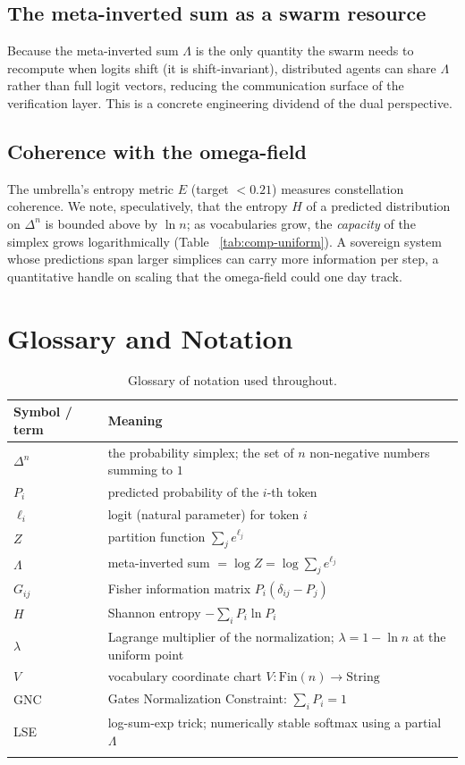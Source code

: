 \documentclass[11pt]{article}
\newcommand{\simplex}[1]{\Delta^{#1}}
\begin{document}
\subsection{The meta-inverted sum as a swarm resource}
\label{sec:sov-swarm}

Because the meta-inverted sum $\Lambda$ is the only quantity the swarm needs to
recompute when logits shift (it is shift-invariant), distributed agents can
share $\Lambda$ rather than full logit vectors, reducing the communication
surface of the verification layer. This is a concrete engineering dividend of
the dual perspective.

\subsection{Coherence with the omega-field}
\label{sec:sov-omega}

The umbrella's entropy metric $E$ (target $<0.21$) measures constellation
coherence. We note, speculatively, that the entropy $H$ of a predicted
distribution on $\simplex{n}$ is bounded above by $\ln n$; as vocabularies grow,
the \emph{capacity} of the simplex grows logarithmically (Table~
\ref{tab:comp-uniform}). A sovereign system whose predictions span larger
simplices can carry more information per step, a quantitative handle on
scaling that the omega-field could one day track.

\section{Glossary and Notation}
\label{sec:glossary}

\begin{longtable}{@{}lp{11cm}@{}}
\toprule
Symbol / term & Meaning \\
\midrule
$\simplex{n}$ & the probability simplex; the set of $n$ non-negative numbers summing to $1$ \\
$P_i$ & predicted probability of the $i$-th token \\
$\ell_i$ & logit (natural parameter) for token $i$ \\
$Z$ & partition function $\sum_j e^{\ell_j}$ \\
$\Lambda$ & meta-inverted sum $= \log Z = \log\sum_j e^{\ell_j}$ \\
$G_{ij}$ & Fisher information matrix $P_i(\delta_{ij}-P_j)$ \\
$H$ & Shannon entropy $-\sum_i P_i\ln P_i$ \\
$\lambda$ & Lagrange multiplier of the normalization; $\lambda=1-\ln n$ at the uniform point \\
$V$ & vocabulary coordinate chart $V:\mathrm{Fin}(n)\to\mathrm{String}$ \\
GNC & Gates Normalization Constraint: $\sum_i P_i = 1$ \\
LSE & log-sum-exp trick; numerically stable softmax using a partial $\Lambda$ \\
\bottomrule
\caption{Glossary of notation used throughout.}
\label{tab:glossary}
\end{longtable}
\end{document}
